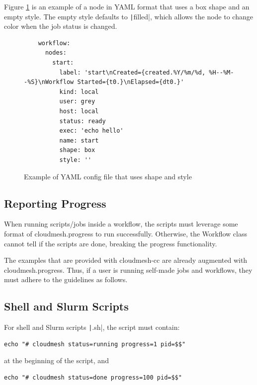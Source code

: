 Figure \ref{fig:shape-style-yaml} is an example of a node in YAML format that uses a box shape and an empty style. The empty style defaults to \texttt|filled|, which allows the node to change color when the job status is changed.

\begin{figure}
    \begin{verbatim}
    workflow:
      nodes:
        start:
          label: 'start\nCreated={created.%Y/%m/%d, %H--%M--%S}\nWorkflow Started={t0.}\nElapsed={dt0.}'
          kind: local
          user: grey
          host: local
          status: ready
          exec: 'echo hello'
          name: start
          shape: box
          style: ''
    \end{verbatim}
    \caption{Example of YAML config file that uses shape and style}
    \label{fig:shape-style-yaml}
\end{figure}



\subsection{Reporting Progress}\label{reporting-progress}

When running scripts/jobs inside a workflow, the scripts must leverage
some format of cloudmesh.progress to run successfully. Otherwise, the
Workflow class cannot tell if the scripts are done, breaking the
progress functionality.

The examples that are provided with cloudmesh-cc are already augmented
with cloudmesh.progress. Thus, if a user is running self-made jobs and
workflows, they must adhere to the guidelines as follows.

\subsection{Shell and Slurm Scripts}\label{shell-and-slurm-scripts}

For shell and Slurm scripts \texttt|.sh|, the script must contain:

\begin{verbatim}
echo "# cloudmesh status=running progress=1 pid=$$"
\end{verbatim}

at the beginning of the script, and

\begin{verbatim}
echo "# cloudmesh status=done progress=100 pid=$$"
\end{verbatim}

